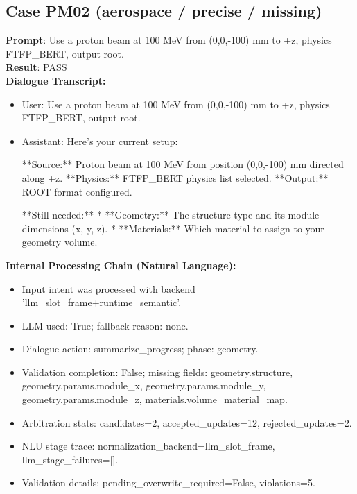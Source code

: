 \documentclass[11pt]{ctexart}
\begin{document}
\subsection{Case PM02 (aerospace / precise / missing)}
\textbf{Prompt}: Use a proton beam at 100 MeV from (0,0,-100) mm to +z, physics FTFP\_BERT, output root.\\
\textbf{Result}: PASS\\
\textbf{Dialogue Transcript:}
\begin{itemize}
\item User: Use a proton beam at 100 MeV from (0,0,-100) mm to +z, physics FTFP\_BERT, output root.
\item Assistant: Here's your current setup:

**Source:** Proton beam at 100 MeV from position (0,0,-100) mm directed along +z.
**Physics:** FTFP\_BERT physics list selected.
**Output:** ROOT format configured.

**Still needed:**
*   **Geometry:** The structure type and its module dimensions (x, y, z).
*   **Materials:** Which material to assign to your geometry volume.
\end{itemize}
\textbf{Internal Processing Chain (Natural Language):}
\begin{itemize}
\item Input intent was processed with backend 'llm\_slot\_frame+runtime\_semantic'.
\item LLM used: True; fallback reason: none.
\item Dialogue action: summarize\_progress; phase: geometry.
\item Validation completion: False; missing fields: geometry.structure, geometry.params.module\_x, geometry.params.module\_y, geometry.params.module\_z, materials.volume\_material\_map.
\item Arbitration stats: candidates=2, accepted\_updates=12, rejected\_updates=2.
\item NLU stage trace: normalization\_backend=llm\_slot\_frame, llm\_stage\_failures=[].
\item Validation details: pending\_overwrite\_required=False, violations=5.
\end{itemize}
\end{document}
